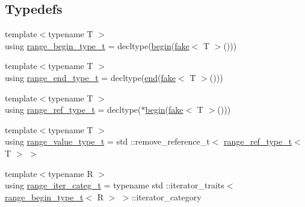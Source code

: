 \subsection*{Typedefs}
\begin{DoxyCompactItemize}
\item 
{\footnotesize template$<$typename T $>$ }\\using \mbox{\hyperlink{namespacerah_a28aff4eeddcece6be65ff0b956d32d4a}{range\+\_\+begin\+\_\+type\+\_\+t}} = decltype(\mbox{\hyperlink{namespacerah_a2c4a19e57cc4e0753e93830f247def6d}{begin}}(\mbox{\hyperlink{namespacerah_a11785bbdf970efa1bc57fc14993b77bf}{fake}}$<$ T $>$()))
\item 
{\footnotesize template$<$typename T $>$ }\\using \mbox{\hyperlink{namespacerah_a9657e24ae477f4482225b133fe286b65}{range\+\_\+end\+\_\+type\+\_\+t}} = decltype(\mbox{\hyperlink{namespacerah_aaddd1442cd76b96876e692cdefe7261d}{end}}(\mbox{\hyperlink{namespacerah_a11785bbdf970efa1bc57fc14993b77bf}{fake}}$<$ T $>$()))
\item 
{\footnotesize template$<$typename T $>$ }\\using \mbox{\hyperlink{namespacerah_a6622426bea22e9509614fe4c574ebeca}{range\+\_\+ref\+\_\+type\+\_\+t}} = decltype($\ast$\mbox{\hyperlink{namespacerah_a2c4a19e57cc4e0753e93830f247def6d}{begin}}(\mbox{\hyperlink{namespacerah_a11785bbdf970efa1bc57fc14993b77bf}{fake}}$<$ T $>$()))
\item 
{\footnotesize template$<$typename T $>$ }\\using \mbox{\hyperlink{namespacerah_a0c0c45ea6e732dc2668edfd0e4f8fccf}{range\+\_\+value\+\_\+type\+\_\+t}} = std \+::remove\+\_\+reference\+\_\+t$<$ \mbox{\hyperlink{namespacerah_a6622426bea22e9509614fe4c574ebeca}{range\+\_\+ref\+\_\+type\+\_\+t}}$<$ T $>$ $>$
\item 
{\footnotesize template$<$typename R $>$ }\\using \mbox{\hyperlink{namespacerah_a7cdcceefd4c7ad3abffb96560d24517d}{range\+\_\+iter\+\_\+categ\+\_\+t}} = typename std \+::iterator\+\_\+traits$<$ \mbox{\hyperlink{namespacerah_a28aff4eeddcece6be65ff0b956d32d4a}{range\+\_\+begin\+\_\+type\+\_\+t}}$<$ R $>$ $>$\+::iterator\+\_\+category
\end{DoxyCompactItemize}
